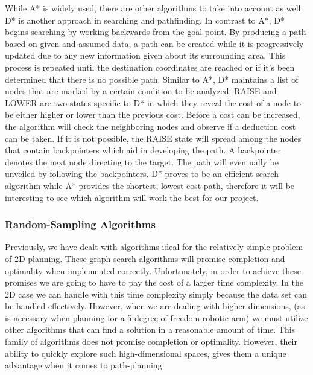 \documentclass[titlepage]{article}
\begin{document}
While A* is widely used, there are other algorithms to take into account as well. D* is another approach in searching and pathfinding. In contrast to A*, D* begins searching by working backwards from the goal point. By producing a path based on given and assumed data, a path can be created while it is progressively updated due to any new information given about its surrounding area. This process is repeated until the destination coordinates are reached or if it’s been determined that there is no possible path. Similar to A*, D* maintains a list of nodes that are marked by a certain condition to be analyzed. RAISE and LOWER are two states specific to D* in which they reveal the cost of a node to be either higher or lower than the previous cost. Before a cost can be increased, the algorithm will check the neighboring nodes and observe if a deduction cost can be taken. If it is not possible, the RAISE state will spread among the nodes that contain backpointers which aid in developing the path. A backpointer denotes the next node directing to the target. The path will eventually be unveiled by following the backpointers. D* proves to be an efficient search algorithm while A* provides the shortest, lowest cost path, therefore it will be interesting to see which algorithm will work the best for our project.
\subsubsection{Random-Sampling Algorithms}
Previously, we have dealt with algorithms ideal for the relatively simple problem of 2D planning. These graph-search algorithms will promise completion and optimality when implemented correctly. Unfortunately, in order to achieve these promises we are going to have to pay the cost of a larger time complexity. In the 2D case we can handle with this time complexity simply because the data set can be handled effectively. However, when we are dealing with higher dimensions, (as is necessary when planning for a 5 degree of freedom robotic arm) we must utilize other algorithms that can find a solution in a reasonable amount of time. This family of algorithms does not promise completion or optimality. However, their ability to quickly explore such high-dimensional spaces, gives them a unique advantage when it comes to path-planning.
\end{document}
